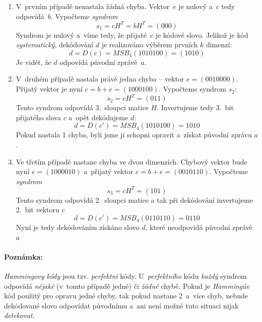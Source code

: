 \documentclass[thesis=M,czech,hidelinks]{FITthesis}[2012/06/26]
\newcommand{\0}{{\textcolor[gray]{0.75}{0}}}
\begin{document}
\begin{enumerate}
    \item V~prvním případě nenastala žádná chyba. Vektor~$e$ je
        nulový a~$c$ tedy odpovídá~$b$. Vypočteme \emph{syndrom}
        $$ s_1 = c H^T = b H^T = (000) $$
        Syndrom je nulový a~víme tedy, že přijaté~$c$ je kódové slovo.
        Jelikož je kód \emph{systematický}, dekódování $d$ je realizováno
        výběrem prvních $k$ dimenzí:
        $$ d = D(c) = MSB_4(1010100) = (1010) $$
        Je vidět, že $d$ odpovídá původní zprávě~$a$.

    \item V~druhém případě nastala právě jedna chyba -- vektor $e=(0010000)$.
        Přijatý vektor je nyní $c = b + e = (1000100)$. Vypočteme syndrom $s_2$:
        $$ s_2 = c H^T = (011) $$
        Tento syndrom odpovídá 3.~sloupci matice $H$. Invertujeme tedy 3.~bit
        přijatého slova $c$ a~opět dekódujeme $d$:
        $$ d = D(c') = MSB_4(1010100) = 1010 $$
        Pokud nastala 1 chyba, byli jsme ji schopni opravit a~získat původní
        zprávu $a$.

    \item Ve třetím případě nastane chyba ve dvou dimenzích. Chybový vektor bude
        nyní $e=(1000010)$ a~přijatý vektor $c = b + e = (0010110)$. Vypočteme
        \emph{syndrom}
        $$ s_3 = c H^T = (101) $$
        Tento syndrom odpovídá 2.~sloupci matice a tak při dekódování
        invertujeme 2.~bit vektoru $c$
        $$ d = D(c') = MSB_4(0110110) = 0110 $$
        Nyní je tedy dekódováním získáno slovo $d$, které neodpovídá původní
        zprávě $a$

\end{enumerate}


\paragraph{Poznámka:} \emph{Hammingovy kódy} jsou tzv. \emph{perfektní} kódy.
U~\emph{perfektního} kódu \emph{každý} syndrom odpovídá \emph{nějaké} (v~tomto
případě jedné) či \emph{žádné} chybě. Pokud je \emph{Hammingův} kód použitý pro
opravu jedné chyby, tak pokud nastane 2~a~více chyb, nebude dekódované slovo
odpovídat původnímu a~ani není možné tuto situaci nijak \emph{detekovat}.





\end{document}
